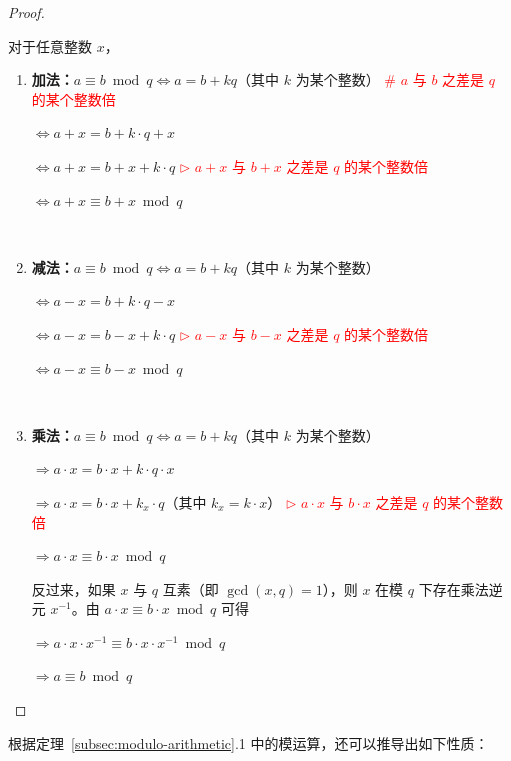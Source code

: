 \begin{proof}

$ $

对于任意整数 $x$，

\begin{enumerate}


\item \textbf{加法：}$a \equiv b \bmod q \Longleftrightarrow a = b + k q $（其中 $k$ 为某个整数）\textcolor{red}{ \text{ } \# $a$ 与 $b$ 之差是 $q$ 的某个整数倍}

$\Longleftrightarrow a + x = b + k\cdot q + x$

$\Longleftrightarrow a + x = b + x + k\cdot q$ \textcolor{red}{ $\rhd$ $a+x$ 与 $b+x$ 之差是 $q$ 的某个整数倍}

$\Longleftrightarrow a + x \equiv b + x \bmod q$

$ $

\item \textbf{减法：}$a \equiv b \bmod q \Longleftrightarrow a = b + k q $（其中 $k$ 为某个整数）

$\Longleftrightarrow a - x = b + k\cdot q - x$

$\Longleftrightarrow a - x = b - x + k\cdot q$ \textcolor{red}{ $\rhd$ $a-x$ 与 $b-x$ 之差是 $q$ 的某个整数倍}

$\Longleftrightarrow a - x \equiv b - x \bmod q$

$ $

\item \textbf{乘法：}$a \equiv b \bmod q \Longleftrightarrow a = b + k q $（其中 $k$ 为某个整数）

$\Longrightarrow a \cdot x = b \cdot x + k\cdot q \cdot x$

$\Longrightarrow a \cdot x = b \cdot x + k_x\cdot q$（其中 $k_x = k \cdot x$）\textcolor{red}{ $\rhd$ $a\cdot x$ 与 $b\cdot x$ 之差是 $q$ 的某个整数倍}

$\Longrightarrow a \cdot x \equiv b \cdot x \bmod q$

反过来，如果 $x$ 与 $q$ 互素（即 $\gcd(x,q)=1$），则 $x$ 在模 $q$ 下存在乘法逆元 $x^{-1}$。由 $a \cdot x \equiv b \cdot x \bmod q$ 可得

$\Longrightarrow a \cdot x \cdot x^{-1} \equiv b \cdot x \cdot x^{-1} \bmod q$

$\Longrightarrow a \equiv b \bmod q$

\end{enumerate}
\end{proof}

根据定理~\ref*{subsec:modulo-arithmetic}.1 中的模运算，还可以推导出如下性质：


